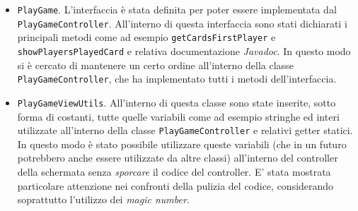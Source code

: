 	\begin{itemize}
	\item \texttt{PlayGame}.
	L'interfaccia è stata definita per poter essere implementata dal \\ \texttt{PlayGameController}. All'interno di questa interfaccia sono stati dichiarati i principali metodi come ad esempio \texttt{getCardsFirstPlayer} e \texttt{showPlayersPlayedCard} e relativa documentazione \textit{Javadoc}. In questo modo si è cercato di mantenere un certo ordine all'interno della classe \texttt{PlayGameController}, che ha implementato tutti i metodi dell'interfaccia.

	\item \texttt{PlayGameViewUtils}.
	All'interno di questa classe sono state inserite, sotto forma di costanti, tutte quelle variabili come ad esempio stringhe ed interi utilizzate all'interno della classe \texttt{PlayGameController} e relativi getter statici. In questo modo è stato possibile utilizzare queste variabili (che in un futuro potrebbero anche essere utilizzate da altre classi) all'interno del controller della schermata senza \textit{sporcare} il codice del controller. E' stata mostrata particolare attenzione nei confronti della pulizia del codice, considerando soprattutto l'utilizzo dei \textit{magic number}.


\end{itemize}
